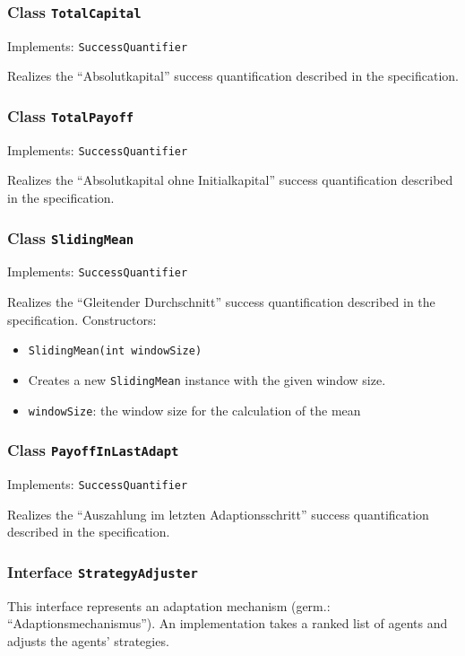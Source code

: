 \documentclass[parskip=full,11pt]{scrartcl}
\begin{document}
\subsubsection{Class \texttt{TotalCapital}}
Implements: \texttt{SuccessQuantifier}

Realizes the \enquote{Absolutkapital} success quantification described in the specification.

\subsubsection{Class \texttt{TotalPayoff}}
Implements: \texttt{SuccessQuantifier}

Realizes the \enquote{Absolutkapital ohne Initialkapital} success quantification described in the specification.

\subsubsection{Class \texttt{SlidingMean}}
Implements: \texttt{SuccessQuantifier}

Realizes the \enquote{Gleitender Durchschnitt} success quantification described in the specification.
\newpage
Constructors:
\begin{itemize}\itemsep -10pt
\item \texttt{SlidingMean(int windowSize)}
\item[] Creates a new \texttt{SlidingMean} instance with the given window size.
\item[] \texttt{windowSize}: the window size for the calculation of the mean
\end{itemize}

\subsubsection{Class \texttt{PayoffInLastAdapt}}
Implements: \texttt{SuccessQuantifier}

Realizes the \enquote{Auszahlung im letzten Adaptionsschritt} success quantification described in the specification.

\subsubsection{Interface \texttt{StrategyAdjuster}}
This interface represents an adaptation mechanism (germ.: \enquote{Adaptionsmechanismus}). An implementation takes a ranked list of agents and adjusts the agents' strategies.
\end{document}
